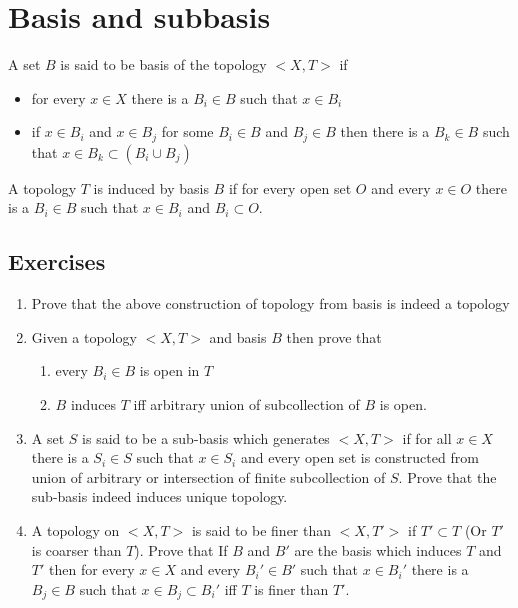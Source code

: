 \documentclass[twosides, openany]{tufte-book}
\begin{document}
\chapter{Basis and subbasis}
A set $B$ is said to be basis of the topology $<X, T>$ if 
\begin{itemize}
    \item for every $x \in X$ there is a $B_i \in B$ such that $x \in B_i$
    \item if $x \in B_i$ and $x \in B_j$ for some $B_i \in B$ and $B_j \in B$ then there is a $B_k \in B$ such that $x \in B_k \subset (B_i \cup B_j)$ 
\end{itemize} 

A topology $T$ is induced by basis $B$ if for every open set $O$ and every $x \in O$ there is a $B_i \in B$ such that $x \in B_i$ and $B_i \subset O$.

\section{Exercises}
    \begin{enumerate}
        \item Prove that the above construction of topology from basis is indeed a topology
        \item Given a topology $<X, T>$ and basis $B$ then prove that
        \begin{enumerate}
            \item every $B_i \in B$ is open in $T$
            \item $B$ induces $T$ iff arbitrary union of subcollection of $B$ is open.   
        \end{enumerate}
        \item A set $S$ is said to be a sub-basis which generates $<X, T>$ if for all $x \in X$ there is a $S_i \in S$ such that $x \in S_i$ and every open set is constructed from union of arbitrary or intersection of finite subcollection of $S$.
        Prove that the sub-basis indeed induces unique topology. 
        \item A topology on $<X, T>$ is said to be finer than $<X, T'>$ if $T' \subset T$ (Or $T'$ is coarser than $T$). 
        Prove that If $B$ and $B'$ are the basis which induces $T$ and $T'$ then for every $x \in X$ and every $B_i' \in B'$ such that $x \in B_i'$ there is a $B_j \in B$ such that $x \in B_j \subset B_i'$ iff $T$ is finer than $T'$.
    \end{enumerate}
\end{document}
